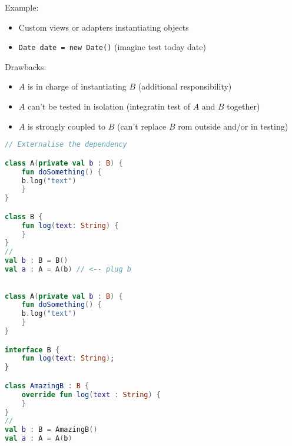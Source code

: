 \documentclass[10pt]{beamer}
\begin{document}
	\begin{frame}[fragile]
		Example:
		\begin{itemize}
			\item Custom views or adapters instantiating objects 
			\item \verb|Date date = new Date()| (imagine test today date) 
		\end{itemize}
	\end{frame}

	\begin{frame}[fragile]
		Drawbacks:
		\begin{itemize}
			\item $A$ is in charge of instantiating $B$ (additional responsibility)
			\item $A$ can't be tested in isolation (integratin test of $A$ and $B$ together) 
			\item $A$ is strongly coupled to $B$ (can't replace $B$ rom outside and/or in testing) 
		\end{itemize}
	\end{frame}
\begin{frame}[fragile]
\begin{lstlisting}[language=Kotlin, basicstyle=\ttfamily]
// Externalise the dependency 

class A(private val b : B) {
    fun doSomething() {
	b.log("text") 
    }
}

class B {
    fun log(text: String) {
    }
}
// 
val b : B = B()
val a : A = A(b) // <-- plug b
\end{lstlisting} 
\end{frame}

\begin{frame}[fragile]
\begin{lstlisting}[language=Kotlin, basicstyle=\ttfamily]

class A(private val b : B) {
    fun doSomething() {
	b.log("text") 
    }
}

interface B {
    fun log(text: String);
}

class AmazingB : B {
    override fun log(text : String) {
    }
}
// 
val b : B = AmazingB()
val a : A = A(b)
\end{lstlisting} 
\end{frame}
\end{document}

